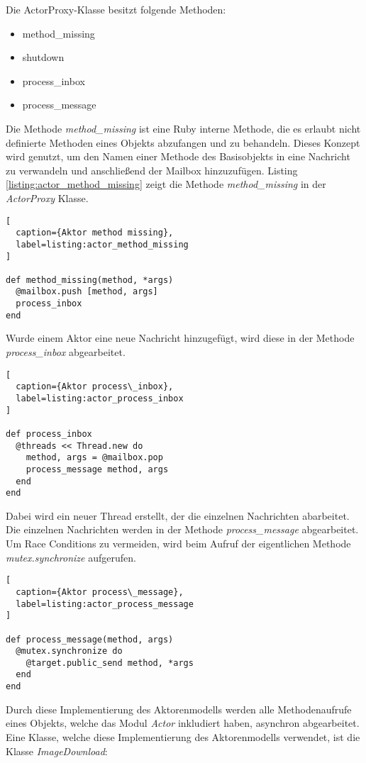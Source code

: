 Die ActorProxy-Klasse besitzt folgende Methoden:

\begin{itemize}
  \item method\_missing
  \item shutdown
  \item process\_inbox
  \item process\_message
\end{itemize}

Die Methode \emph{method\_missing} ist eine Ruby interne Methode, die es erlaubt nicht definierte Methoden eines Objekts abzufangen und zu behandeln. Dieses Konzept wird genutzt, um den Namen einer Methode des Basisobjekts in eine Nachricht zu verwandeln und anschließend der Mailbox hinzuzufügen. Listing \ref{listing:actor_method_missing} zeigt die Methode \emph{method\_missing} in der \emph{ActorProxy} Klasse. 

\begin{lstlisting}[
  caption={Aktor method missing},
  label=listing:actor_method_missing
]

def method_missing(method, *args)
  @mailbox.push [method, args]
  process_inbox
end
\end{lstlisting}

Wurde einem Aktor eine neue Nachricht hinzugefügt, wird diese in der Methode \emph{process\_inbox} abgearbeitet. 

\begin{lstlisting}[
  caption={Aktor process\_inbox},
  label=listing:actor_process_inbox
]

def process_inbox
  @threads << Thread.new do
    method, args = @mailbox.pop
    process_message method, args
  end
end
\end{lstlisting}  

Dabei wird ein neuer Thread erstellt, der die einzelnen Nachrichten abarbeitet. Die einzelnen Nachrichten werden in der Methode \emph{process\_message} abgearbeitet. Um Race Conditions zu vermeiden, wird beim Aufruf der eigentlichen Methode \emph{mutex.synchronize} aufgerufen. 


\begin{lstlisting}[
  caption={Aktor process\_message},
  label=listing:actor_process_message
]

def process_message(method, args)
  @mutex.synchronize do
    @target.public_send method, *args
  end
end
\end{lstlisting}  

Durch diese Implementierung des Aktorenmodells werden alle Methodenaufrufe eines Objekts, welche das Modul \emph{Actor} inkludiert haben, asynchron abgearbeitet. Eine Klasse, welche diese Implementierung des Aktorenmodells verwendet, ist die Klasse \emph{ImageDownload}:

